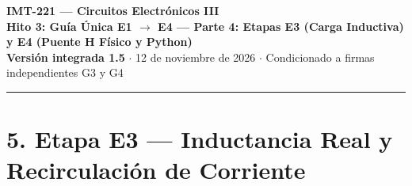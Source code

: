 \documentclass[10pt, a4paper, landscape]{article}
\begin{document}
\noindent
{\LARGE \textbf{\textcolor{ucbblue}{IMT-221 — Circuitos Electrónicos III}}}\\[0.12cm]
{\Large \textbf{Hito 3: Guía Única E1 $\rightarrow$ E4 — Parte 4: Etapas E3 (Carga Inductiva) y E4 (Puente H Físico y Python)}}\\[0.08cm]
{\small \textbf{Versión integrada 1.5} $\cdot$ 12 de noviembre de 2026 $\cdot$ Condicionado a firmas independientes G3 y G4}
\par\vspace{0.15cm}\noindent\rule{\linewidth}{0.4pt}\vspace{0.2cm}

\section*{5. Etapa E3 — Inductancia Real y Recirculación de Corriente}
\end{document}
